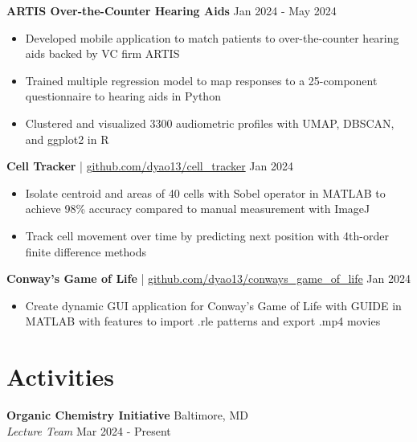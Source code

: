 \documentclass[11pt]{article}       %
\begin{document}
\textbf{ARTIS Over-the-Counter Hearing Aids} \hfill Jan 2024 - May 2024 \vspace{-9pt} \\
\begin{itemize}
  \item Developed mobile application to match patients to over-the-counter hearing aids backed by VC firm ARTIS
  \item Trained multiple regression model to map responses to a 25-component questionnaire to hearing aids in Python
  \item Clustered and visualized 3300 audiometric profiles with UMAP, DBSCAN, and ggplot2 in R
\end{itemize}

\textbf{Cell Tracker} | \href{https://github.com/dyao13/cell_tracker}{github.com/dyao13/cell\_tracker} \hfill Jan 2024 \vspace{-9pt} \\
\begin{itemize}
  \item Isolate centroid and areas of 40 cells with Sobel operator in MATLAB to achieve 98\% accuracy compared to manual measurement with ImageJ
  \item Track cell movement over time by predicting next position with 4th-order finite difference methods
\end{itemize}

\textbf{Conway’s Game of Life} | \href{https://github.com/dyao13/conways_game_of_life}{github.com/dyao13/conways\_game\_of\_life} \hfill Jan 2024 \vspace{-9pt} \\
\begin{itemize}
  \item Create dynamic GUI application for Conway’s Game of Life with GUIDE in MATLAB with features to import .rle patterns and export .mp4 movies
\end{itemize}

\vspace{-18.5pt}

\section*{Activities}
\textbf{Organic Chemistry Initiative} \hfill Baltimore, MD \\
\textit{Lecture Team} \hfill Mar 2024 - Present \\

\vspace{5pt}
\end{document}
